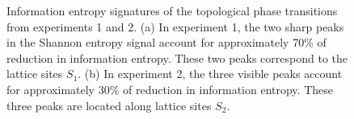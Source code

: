 \documentclass[fleqn,10pt]{wlscirep}
\begin{document}
\begin{figure}
\centering
{}\quad
{}\quad
\caption{Information entropy signatures of the topological phase transitions from experiments 1 and 2. (a) In experiment 1, the two sharp peaks in the Shannon entropy signal account for approximately 70\% of reduction in information entropy. These two peaks correspond to the lattice sites $S_1$. (b) In experiment 2, the three visible peaks account for approximately 30\% of reduction in information entropy. These three peaks are located along lattice sites $S_2$.}
\label{feature_importances}
\end{figure}
\end{document}
